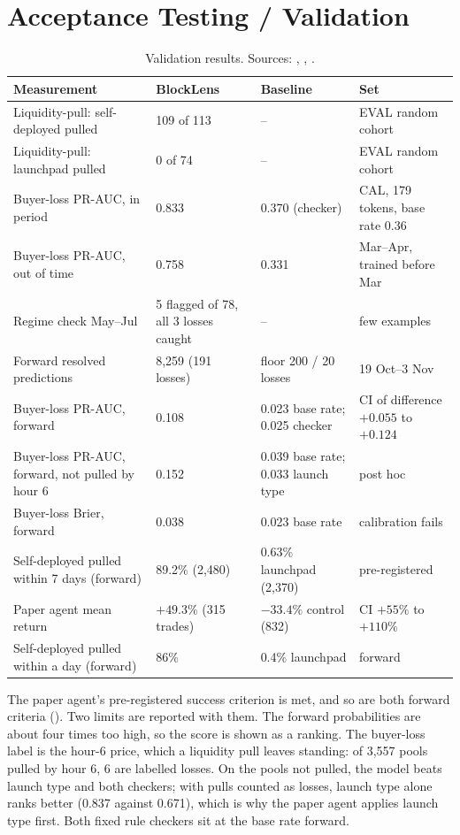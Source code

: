 \section{Acceptance Testing / Validation}
\begin{table}[H]
\centering\small
\begin{tabular}{p{}p{}p{}p{}}
\toprule
Measurement & BlockLens & Baseline & Set\\
\midrule
Liquidity-pull: self-deployed pulled & 109 of 113 & -- & EVAL random cohort\\
Liquidity-pull: launchpad pulled & 0 of 74 & -- & EVAL random cohort\\
Buyer-loss PR-AUC, in period & 0.833 & 0.370 (checker) & CAL, 179 tokens, base rate 0.36\\
Buyer-loss PR-AUC, out of time & 0.758 & 0.331 & Mar--Apr, trained before Mar\\
Regime check May--Jul & 5 flagged of 78, all 3 losses caught & -- & few examples\\
Forward resolved predictions & 8,259 (191 losses) & floor 200 / 20 losses & 19 Oct--3 Nov\\
Buyer-loss PR-AUC, forward & 0.108 & 0.023 base rate; 0.025 checker & CI of difference $+0.055$ to $+0.124$\\
Buyer-loss PR-AUC, forward, not pulled by hour 6 & 0.152 & 0.039 base rate; 0.033 launch type & post hoc\\
Buyer-loss Brier, forward & 0.038 & 0.023 base rate & calibration fails\\
Self-deployed pulled within 7 days (forward) & 89.2\% (2,480) & 0.63\% launchpad (2,370) & pre-registered\\
Paper agent mean return & $+49.3\%$ (315 trades) & $-33.4\%$ control (832) & CI $+55\%$ to $+110\%$\\
Self-deployed pulled within a day (forward) & 86\% & 0.4\% launchpad & forward\\
\bottomrule
\end{tabular}
\caption{Validation results. Sources: , , .}
\end{table}
The paper agent's pre-registered success criterion is met, and so are both forward criteria (). Two limits are reported with them. The forward probabilities are about four times too high, so the score is shown as a ranking. The buyer-loss label is the hour-6 price, which a liquidity pull leaves standing: of 3,557 pools pulled by hour 6, 6 are labelled losses. On the pools not pulled, the model beats launch type and both checkers; with pulls counted as losses, launch type alone ranks better (0.837 against 0.671), which is why the paper agent applies launch type first. Both fixed rule checkers sit at the base rate forward.

